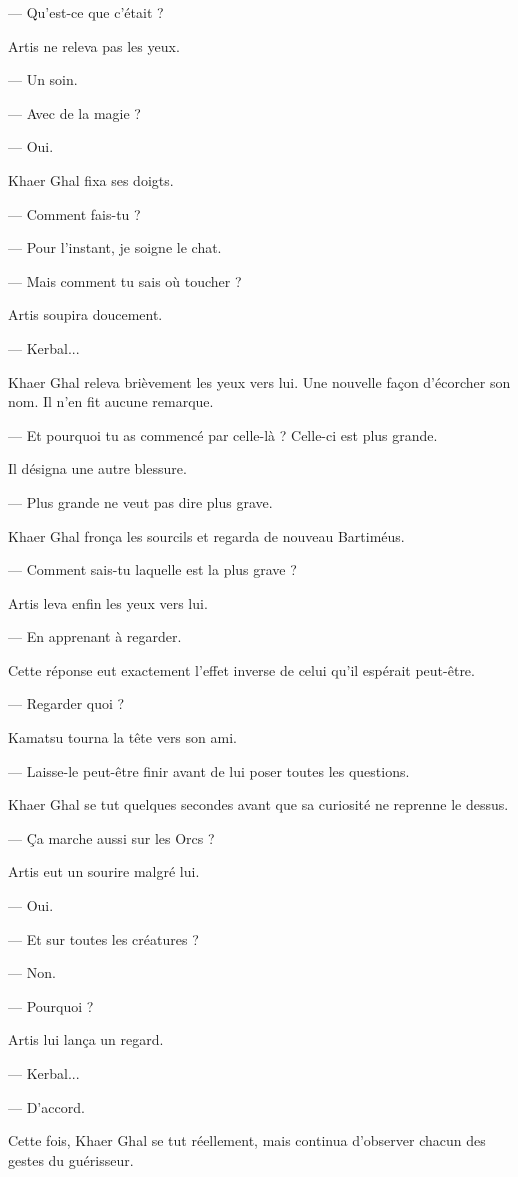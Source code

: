 — Qu'est-ce que c'était ?

Artis ne releva pas les yeux.

— Un soin.

— Avec de la magie ?

— Oui.

Khaer Ghal fixa ses doigts.

— Comment fais-tu ?

— Pour l'instant, je soigne le chat.

— Mais comment tu sais où toucher ?

Artis soupira doucement.

— Kerbal...

Khaer Ghal releva brièvement les yeux vers lui. Une nouvelle façon d'écorcher
son nom. Il n'en fit aucune remarque.

— Et pourquoi tu as commencé par celle-là ? Celle-ci est plus grande.

Il désigna une autre blessure.

— Plus grande ne veut pas dire plus grave.

Khaer Ghal fronça les sourcils et regarda de nouveau Bartiméus.

— Comment sais-tu laquelle est la plus grave ?

Artis leva enfin les yeux vers lui.

— En apprenant à regarder.

Cette réponse eut exactement l'effet inverse de celui qu'il espérait peut-être.

— Regarder quoi ?

Kamatsu tourna la tête vers son ami.

— Laisse-le peut-être finir avant de lui poser toutes les questions.

Khaer Ghal se tut quelques secondes avant que sa curiosité ne reprenne le
dessus.

— Ça marche aussi sur les Orcs ?

Artis eut un sourire malgré lui.

— Oui.

— Et sur toutes les créatures ?

— Non.

— Pourquoi ?

Artis lui lança un regard.

— Kerbal...

— D'accord.

Cette fois, Khaer Ghal se tut réellement, mais continua d'observer chacun des
gestes du guérisseur.

